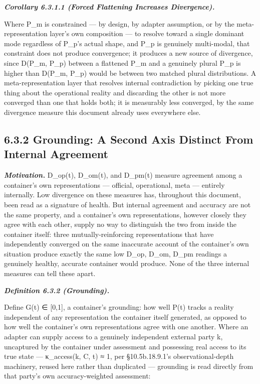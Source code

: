 \documentclass[
]{article}
\begin{document}
\emph{\textbf{Corollary 6.3.1.1 (Forced Flattening Increases
Divergence).}}

Where P\_m is constrained --- by design, by adapter assumption, or by
the meta-representation layer's own composition --- to resolve toward a
single dominant mode regardless of P\_p's actual shape, and P\_p is
genuinely multi-modal, that constraint does not produce convergence; it
produces a new source of divergence, since D(P\_m, P\_p) between a
flattened P\_m and a genuinely plural P\_p is higher than D(P\_m, P\_p)
would be between two matched plural distributions. A meta-representation
layer that resolves internal contradiction by picking one true thing
about the operational reality and discarding the other is not more
converged than one that holds both; it is measurably less converged, by
the same divergence measure this document already uses everywhere else.

\hypertarget{grounding-a-second-axis-distinct-from-internal-agreement}{%
\subsection{6.3.2 Grounding: A Second Axis Distinct From Internal
Agreement}\label{grounding-a-second-axis-distinct-from-internal-agreement}}

\emph{\textbf{Motivation.}} D\_op(t), D\_om(t), and D\_pm(t) measure
agreement among a container's own representations --- official,
operational, meta --- entirely internally. Low divergence on these
measures has, throughout this document, been read as a signature of
health. But internal agreement and accuracy are not the same property,
and a container's own representations, however closely they agree with
each other, supply no way to distinguish the two from inside the
container itself: three mutually-reinforcing representations that have
independently converged on the same inaccurate account of the
container's own situation produce exactly the same low D\_op, D\_om,
D\_pm readings a genuinely healthy, accurate container would produce.
None of the three internal measures can tell these apart.

\emph{\textbf{Definition 6.3.2 (Grounding).}}

Define G(t) ∈ {[}0,1{]}, a container's grounding: how well P(t) tracks a
reality independent of any representation the container itself
generated, as opposed to how well the container's own representations
agree with one another. Where an adapter can supply access to a
genuinely independent external party k, uncaptured by the container
under assessment and possessing real access to its true state ---
κ\_access(k, C, t) ≈ 1, per §10.5b.18.9.1's observational-depth
machinery, reused here rather than duplicated --- grounding is read
directly from that party's own accuracy-weighted assessment:
\end{document}
